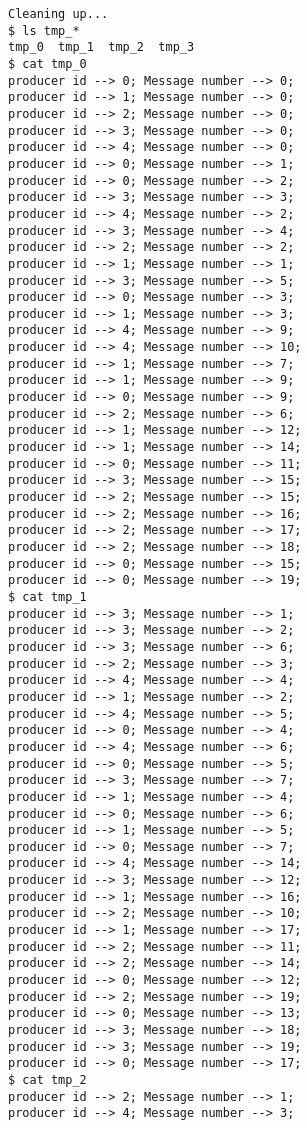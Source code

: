 \documentclass[11pt]{article}
\begin{document}
\begin{question}
\begin{subquestion}
\begin{verbatim}
Cleaning up...
$ ls tmp_*
tmp_0  tmp_1  tmp_2  tmp_3
$ cat tmp_0
producer id --> 0; Message number --> 0;
producer id --> 1; Message number --> 0;
producer id --> 2; Message number --> 0;
producer id --> 3; Message number --> 0;
producer id --> 4; Message number --> 0;
producer id --> 0; Message number --> 1;
producer id --> 0; Message number --> 2;
producer id --> 3; Message number --> 3;
producer id --> 4; Message number --> 2;
producer id --> 3; Message number --> 4;
producer id --> 2; Message number --> 2;
producer id --> 1; Message number --> 1;
producer id --> 3; Message number --> 5;
producer id --> 0; Message number --> 3;
producer id --> 1; Message number --> 3;
producer id --> 4; Message number --> 9;
producer id --> 4; Message number --> 10;
producer id --> 1; Message number --> 7;
producer id --> 1; Message number --> 9;
producer id --> 0; Message number --> 9;
producer id --> 2; Message number --> 6;
producer id --> 1; Message number --> 12;
producer id --> 1; Message number --> 14;
producer id --> 0; Message number --> 11;
producer id --> 3; Message number --> 15;
producer id --> 2; Message number --> 15;
producer id --> 2; Message number --> 16;
producer id --> 2; Message number --> 17;
producer id --> 2; Message number --> 18;
producer id --> 0; Message number --> 15;
producer id --> 0; Message number --> 19;
$ cat tmp_1
producer id --> 3; Message number --> 1;
producer id --> 3; Message number --> 2;
producer id --> 3; Message number --> 6;
producer id --> 2; Message number --> 3;
producer id --> 4; Message number --> 4;
producer id --> 1; Message number --> 2;
producer id --> 4; Message number --> 5;
producer id --> 0; Message number --> 4;
producer id --> 4; Message number --> 6;
producer id --> 0; Message number --> 5;
producer id --> 3; Message number --> 7;
producer id --> 1; Message number --> 4;
producer id --> 0; Message number --> 6;
producer id --> 1; Message number --> 5;
producer id --> 0; Message number --> 7;
producer id --> 4; Message number --> 14;
producer id --> 3; Message number --> 12;
producer id --> 1; Message number --> 16;
producer id --> 2; Message number --> 10;
producer id --> 1; Message number --> 17;
producer id --> 2; Message number --> 11;
producer id --> 2; Message number --> 14;
producer id --> 0; Message number --> 12;
producer id --> 2; Message number --> 19;
producer id --> 0; Message number --> 13;
producer id --> 3; Message number --> 18;
producer id --> 3; Message number --> 19;
producer id --> 0; Message number --> 17;
$ cat tmp_2
producer id --> 2; Message number --> 1;
producer id --> 4; Message number --> 3;

\end{verbatim}
\end{subquestion}
\end{question}
\end{document}
